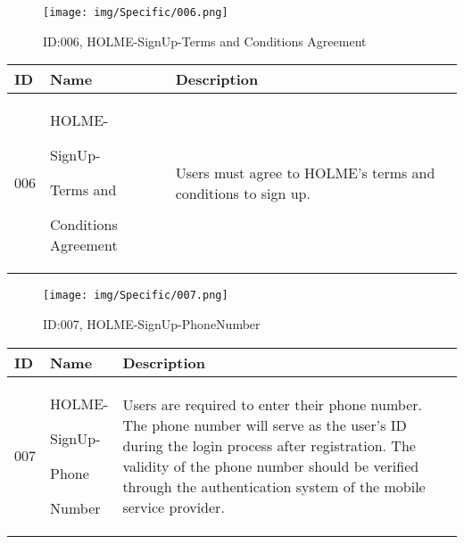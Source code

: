 \documentclass[conference]{IEEEtran}
\begin{document}
\begin{enumerate}
\begin{figure}[h]
\centering
\texttt{[image: img/Specific/006.png]}
\caption{ID:006, HOLME-SignUp-Terms and Conditions Agreement}
\end{figure}
\begin{table}[h]
\def\arraystretch{1.2} \small
    \begin{tabular}{|p{1cm}|p{1.8cm}|p{5.0cm}|}
        \hline
        ID & Name & Description\\ \hline
         006 \par  & HOLME-\par SignUp-\par Terms and \par Conditions Agreement &Users must agree to HOLME's terms and conditions to sign up.\\ \hline
	\end{tabular}
\end{table}

\begin{figure}[h]
\centering
\texttt{[image: img/Specific/007.png]}
\caption{ID:007, HOLME-SignUp-PhoneNumber}
\end{figure}
\begin{table}[h]
\def\arraystretch{1.2} \small
    \begin{tabular}{|p{1cm}|p{1.8cm}|p{5.0cm}|}
        \hline
        ID & Name & Description\\ \hline
         007 \par  & HOLME-\par SignUp-\par Phone \par Number &Users are required to enter their phone number. The phone number will serve as the user's ID during the login process after registration. The validity of the phone number should be verified through the authentication system of the mobile service provider.\\ \hline
	\end{tabular}
\end{table}
\clearpage



\end{enumerate}
\end{document}

